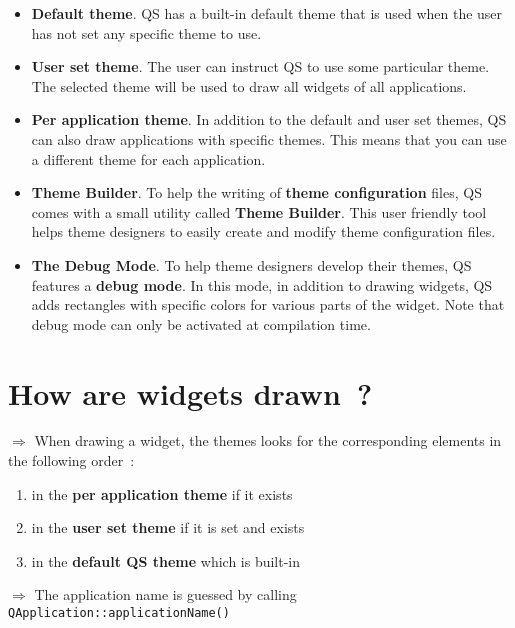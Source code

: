 \documentclass[a4paper,12pt]{report}
\begin{document}
\begin{itemize}
  \item \textbf{Default theme}. QS has a built-in default theme that is used
when the user has not set any specific theme to use.\\

  \item \textbf{User set theme}. The user can instruct QS to use some
particular theme. The selected theme will be used to draw all widgets of all
applications.\\

  \item \textbf{Per application theme}. In addition to the default and user set
themes, QS can also draw applications with specific themes. This means that you
can use a different theme for each application.

  \item \textbf{Theme Builder}. To help the writing of \textbf{theme
configuration} files, QS comes with a small utility called \textbf{Theme
Builder}. This user friendly tool helps theme designers to easily create and
modify theme configuration files.\\

  \item \textbf{The Debug Mode}. To help theme designers develop their themes,
QS features a \textbf{debug mode}. In this mode, in addition to drawing
widgets, QS adds rectangles with specific colors for various parts of the
widget. Note that debug mode can only be activated at compilation time.
\end{itemize}

\section{How are widgets drawn~?}
$\Rightarrow$ When drawing a widget, the themes looks for the corresponding
elements in the following order~:

\begin{enumerate}
  \item in the \textbf{per application theme} if it exists
  \item in the \textbf{user set theme} if it is set and exists
  \item in the \textbf{default QS theme} which is built-in
\end{enumerate}

$\Rightarrow$ The application name is guessed by calling
\verb,QApplication::applicationName(),\\
\end{document}
